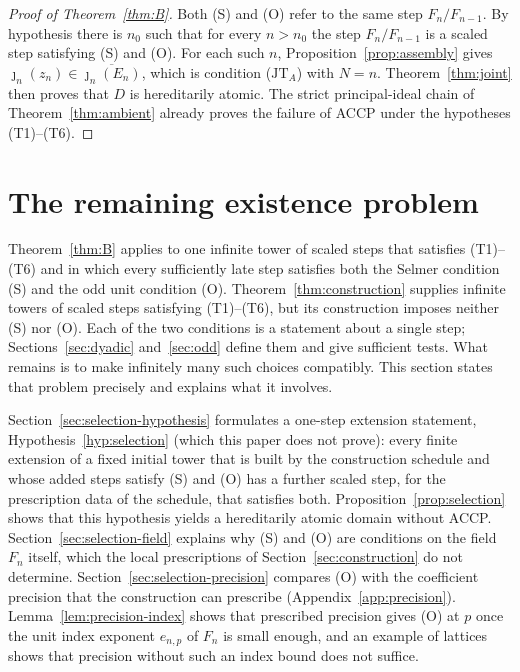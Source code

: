 \documentclass[11pt]{article}
\theoremstyle{plain}
\theoremstyle{definition}
\theoremstyle{remark}
\begin{document}
\begin{proof}[Proof of Theorem~\ref{thm:B}]
Both (S) and (O) refer to the same step $F_n/F_{n-1}$.  By hypothesis
there is $n_0$ such that for every $n>n_0$ the step $F_n/F_{n-1}$ is a
scaled step satisfying (S) and (O).  For each such $n$,
Proposition~\ref{prop:assembly} gives
$\jmath_n(z_n)\in\overline{\jmath_n(E_n)}$, which is condition
\textup{($\mathrm{JT}_A$)} with $N=n$.  Theorem~\ref{thm:joint} then
proves that $D$ is hereditarily atomic.  The strict principal-ideal chain
of Theorem~\ref{thm:ambient} already proves the failure of ACCP under the
hypotheses \textup{(T1)--(T6)}.
\end{proof}

\section{The remaining existence problem}\label{sec:selection}
Theorem~\ref{thm:B} applies to one infinite tower of scaled steps that
satisfies \textup{(T1)--(T6)} and in which every sufficiently late step
satisfies both the Selmer condition (S) and the odd unit condition (O).
Theorem~\ref{thm:construction} supplies infinite towers of scaled steps
satisfying \textup{(T1)--(T6)}, but its construction imposes neither (S)
nor (O).  Each of the two conditions is a statement about a single step;
Sections~\ref{sec:dyadic} and~\ref{sec:odd} define them and give
sufficient tests.  What
remains is to make infinitely many such choices compatibly.  This section
states that problem precisely and explains what it involves.

Section~\ref{sec:selection-hypothesis} formulates a one-step extension
statement, Hypothesis~\ref{hyp:selection} (which this paper does not
prove): every finite extension of a
fixed initial tower that is built by the construction schedule and whose
added steps satisfy (S) and (O) has a further scaled step, for the
prescription data of the schedule, that satisfies both.
Proposition~\ref{prop:selection} shows that this hypothesis yields a
hereditarily atomic domain without ACCP.
Section~\ref{sec:selection-field} explains why (S) and (O) are conditions
on the field $F_n$ itself, which the local prescriptions of
Section~\ref{sec:construction} do not determine.
Section~\ref{sec:selection-precision} compares (O) with the coefficient
precision that the construction can prescribe
(Appendix~\ref{app:precision}).  Lemma~\ref{lem:precision-index} shows
that prescribed precision gives (O) at $p$ once the unit index exponent
$e_{n,p}$ of $F_n$ is small enough, and an example of lattices shows that precision without
such an index bound does not suffice.
\end{document}
